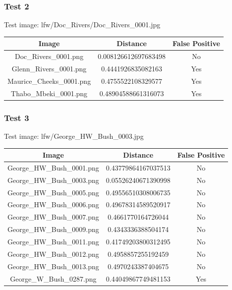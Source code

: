 \documentclass[12pt]{article}
\begin{document}
\subsubsection{Test 2}
Test image: lfw/Doc\_Rivers/Doc\_Rivers\_0001.jpg

\begin{center}
\begin{tabular}{ccc}
Image & Distance & False Positive \\
\hline
Doc\_Rivers\_0001.png & 0.008126612697683498 & No \\
Glenn\_Rivers\_0001.png & 0.4441926835082163 & Yes \\
Maurice\_Cheeks\_0001.png & 0.4755522108329577 & Yes \\
Thabo\_Mbeki\_0001.png & 0.48904588661316073 & Yes \\
\end{tabular}
\end{center}

\newpage
\subsubsection{Test 3}
Test image: lfw/George\_HW\_Bush\_0003.jpg

\begin{center}
\begin{tabular}{ccc}
Image & Distance & False Positive \\
\hline
George\_HW\_Bush\_0001.png & 0.43779864167037513 & No \\
George\_HW\_Bush\_0003.png & 0.05526240671390998 & No \\
George\_HW\_Bush\_0005.png & 0.49556510308006735 & No \\
George\_HW\_Bush\_0006.png & 0.49678314589520917 & No \\
George\_HW\_Bush\_0007.png & 0.4661770164726044 & No \\
George\_HW\_Bush\_0009.png & 0.4343336388504174 & No \\
George\_HW\_Bush\_0011.png & 0.41749203800312495 & No \\
George\_HW\_Bush\_0012.png & 0.4958857255192459 & No \\
George\_HW\_Bush\_0013.png & 0.4970243387404675 & No \\
George\_W\_Bush\_0287.png & 0.44049867749481153 & Yes \\

\end{tabular}
\end{center}
\end{document}
